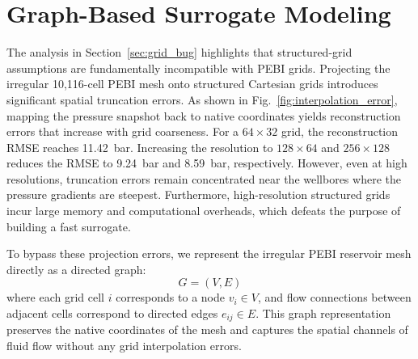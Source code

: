 \section{Graph-Based Surrogate Modeling}
\label{sec:graph}
The analysis in Section~\ref{sec:grid_bug} highlights that structured-grid assumptions are fundamentally incompatible with PEBI grids. Projecting the irregular 10,116-cell PEBI mesh onto structured Cartesian grids introduces significant spatial truncation errors. As shown in Fig.~\ref{fig:interpolation_error}, mapping the pressure snapshot back to native coordinates yields reconstruction errors that increase with grid coarseness. For a $64 \times 32$ grid, the reconstruction RMSE reaches 11.42~bar. Increasing the resolution to $128 \times 64$ and $256 \times 128$ reduces the RMSE to 9.24~bar and 8.59~bar, respectively. However, even at high resolutions, truncation errors remain concentrated near the wellbores where the pressure gradients are steepest. Furthermore, high-resolution structured grids incur large memory and computational overheads, which defeats the purpose of building a fast surrogate.

To bypass these projection errors, we represent the irregular PEBI reservoir mesh directly as a directed graph:
\begin{equation}
\label{eq:graph_def}
G = (V, E)
\end{equation}
where each grid cell $i$ corresponds to a node $v_i \in V$, and flow connections between adjacent cells correspond to directed edges $e_{ij} \in E$. This graph representation preserves the native coordinates of the mesh and captures the spatial channels of fluid flow without any grid interpolation errors.

